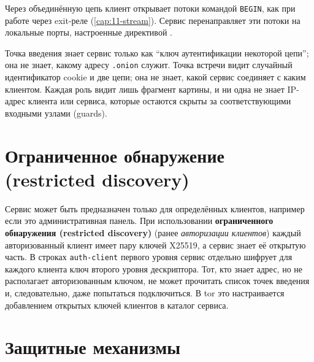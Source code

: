 Через объединённую цепь клиент открывает потоки командой \texttt{BEGIN}, как при работе через exit-реле (\cref{cap:11-stream}). Сервис перенаправляет эти потоки на локальные порты, настроенные директивой .

\begin{approfondimento}
Точка введения знает сервис только как \enquote{ключ аутентификации некоторой цепи}; она не знает, какому адресу \texttt{.onion} служит. Точка встречи видит случайный идентификатор cookie и две цепи; она не знает, какой сервис соединяет с каким клиентом. Каждая роль видит лишь фрагмент картины, и ни одна не знает IP-адрес клиента или сервиса, которые остаются скрыты за соответствующими входными узлами (guards).
\end{approfondimento}

\section{Ограниченное обнаружение (restricted discovery)}\label{sec:os-ristretta}

Сервис может быть предназначен только для определённых клиентов, например если это административная панель. При использовании \textbf{ограниченного обнаружения (restricted discovery)} (ранее \emph{авторизации клиентов}) каждый авторизованный клиент имеет пару ключей X25519, а сервис знает её открытую часть. В строках \texttt{auth-client} первого уровня сервис отдельно шифрует для каждого клиента ключ второго уровня дескриптора. Тот, кто знает адрес, но не располагает авторизованным ключом, не может прочитать список точек введения и, следовательно, даже попытаться подключиться. В tor это настраивается добавлением открытых ключей клиентов в каталог  сервиса.

\section{Защитные механизмы}\label{sec:os-difese}

